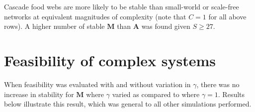 \documentclass[]{article}
\begin{document}
Cascade food webs are more likely to be stable than small-world or
scale-free networks at equivalent magnitudes of complexity (note that
\(C = 1\) for all above rows). A higher number of stable \(\mathbf{M}\)
than \(\mathbf{A}\) was found given \(S \geq 27\).

\hypertarget{Feasibility}{\section{Feasibility of complex
systems}\label{Feasibility}}

When feasibility was evaluated with and without variation in \(\gamma\),
there was no increase in stability for \(\mathbf{M}\) where \(\gamma\)
varied as compared to where \(\gamma = 1\). Results below illustrate
this result, which was general to all other simulations performed.
\end{document}
